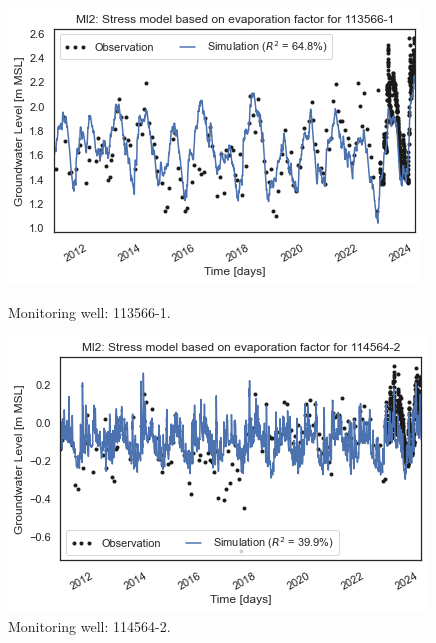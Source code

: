 \begin{figure}[htbp]
    \centering
    \begin{minipage}{0.32\textwidth}
        \centering
        \includegraphics[width=\linewidth]{frontmatter/Rozenburg-fig/1135661.png}
        \caption{Monitoring well: 113566-1.}
        \label{fig:113566-1}
    \end{minipage}
    \hfill
    \begin{minipage}{0.32\textwidth}
        \centering
        \includegraphics[width=\linewidth]{frontmatter/Rozenburg-fig/1145642(2).png}
        \caption{Monitoring well: 114564-2.}
        \label{fig:114564-2}
    \end{minipage}
    \hfill
    \begin{minipage}{0.32\textwidth}
        \centering

\end{minipage}
\end{figure}
